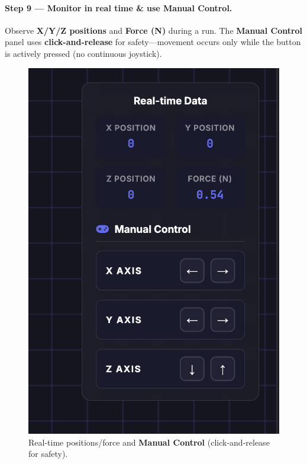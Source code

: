 \documentclass[
    twocolumn,
    fontsize = 10pt,
    parskip = half+,
    headings = small,
    headwidth = text,
    footwidth = text,
]{scrartcl}
\begin{document}
\paragraph{\textbf{Step 9 — Monitor in real time \& use Manual Control.}}
Observe \textbf{X/Y/Z positions} and \textbf{Force (N)} during a run. The \textbf{Manual Control} panel uses \textbf{click-and-release} for safety—movement occurs only while the button is actively pressed (no continuous joystick).
\begin{figure}[htbp]\centering
  \includegraphics[width=.9\linewidth]{pics/sb-8.png}
  \caption{Real-time positions/force and \textbf{Manual Control} (click-and-release for safety).}
  \label{fig:sb-8}
\end{figure}
\end{document}
